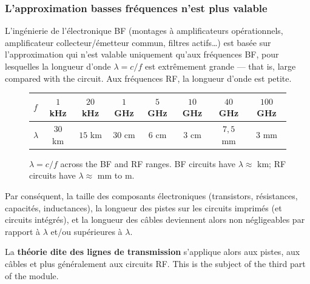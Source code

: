 \subsubsection{L'approximation basses fréquences n'est plus valable}
L'ingénierie de l'électronique BF (montages à amplificateurs opérationnels,
amplificateur collecteur/émetteur commun, filtres actifs…) est basée sur
l'approximation qui n'est valable uniquement qu'aux fréquences BF, pour
lesquelles la longueur d'onde $\lambda=c/f$ est extrêmement grande --- that is,
large compared with the circuit. Aux fréquences RF, la longueur d'onde est petite.

\begin{figure}[h!]
  \centering
  \small
  \begin{tabular}{lccccccc}
    \toprule
    $f$       & $1$ kHz & $20$ kHz & $1$ GHz & $5$ GHz & $10$ GHz & $40$ GHz & $100$ GHz \\
    \midrule
    $\lambda$ & $30$ km & $15$ km  & $30$ cm & $6$ cm  & $3$ cm   & $7{,}5$ mm & $3$ mm \\
    \bottomrule
  \end{tabular}
  \caption*{\small $\lambda=c/f$ across the BF and RF ranges. BF circuits have
  $\lambda \approx$ km; RF circuits have $\lambda \approx$ mm to m.}
\end{figure}

Par conséquent, la taille des composants électroniques (transistors,
résistances, capacités, inductances), la longueur des pistes sur les circuits
imprimés (et circuits intégrés), et la longueur des câbles deviennent alors non
négligeables par rapport à $\lambda$ et/ou supérieures à $\lambda$.

\begin{conclusion}
  La \textbf{théorie dite des lignes de transmission} s'applique alors aux
  pistes, aux câbles et plus généralement aux circuits RF. This is the subject
  of the third part of the module.
\end{conclusion}

